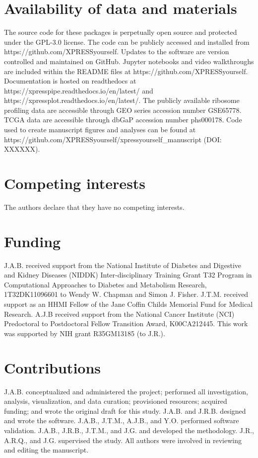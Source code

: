 \documentclass[10pt, oneside]{article}
\begin{document}
\section*{Availability of data and materials}
The source code for these packages is perpetually open source and protected under the GPL-3.0 license. The code can be publicly accessed and installed from https://github.com/XPRESSyourself. Updates to the software are version controlled and maintained on GitHub. Jupyter notebooks and video walkthroughs are included within the README files at https://github.com/XPRESSyourself. Documentation is hosted on readthedocs \cite{readthedocs} at https://xpresspipe.readthedocs.io/en/latest/ and https://xpressplot.readthedocs.io/en/latest/. The publicly available ribosome profiling data are accessible through GEO series accession number GSE65778. TCGA data are accessible through dbGaP accession number phs000178. Code used to create manuscript figures and analyses can be found at https://github.com/XPRESSyourself/xpressyourself\_manuscript (DOI: XXXXXX).

\section*{Competing interests}
The authors declare that they have no competing interests.

\section*{Funding}
J.A.B. received support from the National Institute of Diabetes and Digestive and Kidney Diseases (NIDDK) Inter-disciplinary Training Grant T32 Program in Computational Approaches to Diabetes and Metabolism Research, 1T32DK11096601 to Wendy W. Chapman and Simon J. Fisher. J.T.M. received support as an HHMI Fellow of the Jane Coffin Childs Memorial Fund for Medical Research. A.J.B received support from the National Cancer Institute (NCI) Predoctoral to Postdoctoral Fellow Transition Award, K00CA212445. This work was supported by NIH grant R35GM13185 (to J.R.).

\section*{Contributions}
J.A.B. conceptualized and administered the project; performed all investigation, analysis, visualization, and data curation; provisioned resources; acquired funding; and wrote the original draft for this study. J.A.B. and J.R.B. designed and wrote the software. J.A.B., J.T.M., A.J.B., and Y.O. performed software validation. J.A.B., J.R.B., J.T.M., and J.G. and developed the methodology. J.R., A.R.Q., and J.G. supervised the study. All authors were involved in reviewing and editing the manuscript.
\end{document}
